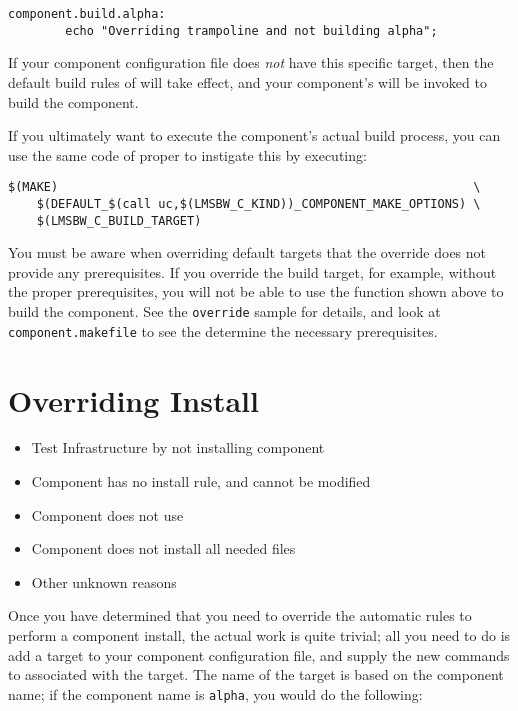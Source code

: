 \begin{verbatim}
component.build.alpha:
        echo "Overriding trampoline and not building alpha";
\end{verbatim}

If your component configuration file does \emph{not} have this
specific target, then the default build rules of \lmsbw will take
effect, and your component's \makefile will be invoked to build the
component.

If you ultimately want to execute the component's actual build
process, you can use the same code of \lmsbw proper to instigate this
by executing:

\begin{verbatim}
$(MAKE)                                                          \
    $(DEFAULT_$(call uc,$(LMSBW_C_KIND))_COMPONENT_MAKE_OPTIONS) \
    $(LMSBW_C_BUILD_TARGET)
\end{verbatim}

You must be aware when overriding default targets that the override
does not provide any prerequisites.  If you override the build target,
for example, without the proper prerequisites, you will not be able to
use the function shown above to build the component.  See the
\texttt{override} sample for details, and look at
\texttt{component.makefile} to see the determine the necessary
prerequisites.

\section{Overriding Install}\label{overriding:overriding-install}

\begin{itemize}
\item Test \bni Infrastructure by not installing component
\item Component \makefile has no install rule, and cannot be modified
\item Component \makefile does not use \destdir
\item Component does not install all needed files
\item Other unknown reasons
\end{itemize}


Once you have determined that you need to override the automatic rules
to perform a component install, the actual work is quite trivial; all
you need to do is add a \makefile target to your component
configuration file, and supply the new commands to associated with the
target.  The name of the target is based on the component name; if the
component name is \texttt{alpha}, you would do the following:


